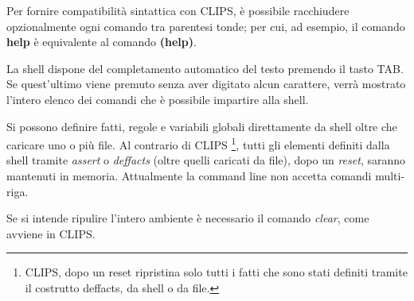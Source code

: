 Per fornire compatibilità sintattica con CLIPS, è possibile racchiudere opzionalmente ogni comando tra parentesi tonde; per cui, ad esempio, il comando \textbf{help} è equivalente al comando \textbf{(help)}.


La shell dispone del completamento automatico del testo premendo il tasto TAB. Se quest'ultimo viene premuto senza aver digitato alcun carattere, verrà mostrato l'intero elenco dei comandi che è possibile impartire alla shell.

Si possono definire fatti, regole e variabili globali direttamente da shell oltre che caricare uno o più file. Al contrario di CLIPS \footnote{CLIPS, dopo un reset ripristina solo tutti i fatti che sono stati definiti tramite il costrutto deffacts, da shell o da file.}, tutti gli elementi definiti dalla shell tramite \emph{assert} o \emph{deffacts} (oltre quelli caricati da file), dopo un \emph{reset}, saranno mantenuti in memoria. Attualmente la command line non accetta comandi multi-riga.

Se si intende ripulire l'intero ambiente è necessario il comando \emph{clear}, come avviene in CLIPS.
